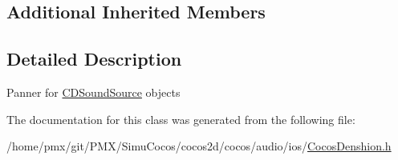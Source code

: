 \subsection*{Additional Inherited Members}


\subsection{Detailed Description}
Panner for \hyperlink{interfaceCDSoundSource}{C\+D\+Sound\+Source} objects 

The documentation for this class was generated from the following file\+:\begin{DoxyCompactItemize}
\item 
/home/pmx/git/\+P\+M\+X/\+Simu\+Cocos/cocos2d/cocos/audio/ios/\hyperlink{cocos2d_2cocos_2audio_2ios_2CocosDenshion_8h}{Cocos\+Denshion.\+h}\end{DoxyCompactItemize}
